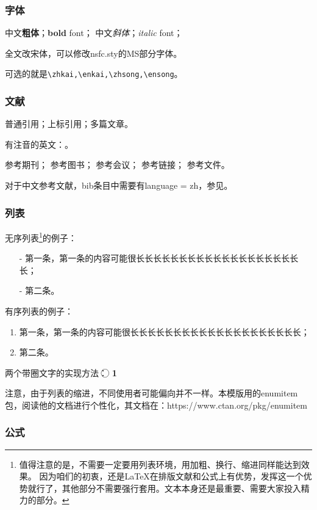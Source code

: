 \subsubsection{字体}
中文\textbf{粗体}；\textbf{bold} font；
中文\textit{斜体}；\textit{italic} font；

全文改宋体，可以修改nsfc.sty的MS部分字体。

可选的就是\verb|\zhkai,\enkai,\zhsong,\ensong|。

\subsubsection{文献}
普通引用\cite{test}；上标引用；多篇文章。

有注音的英文：\cite{test}。

参考期刊\cite{test}；
参考图书\cite{test2}；
参考会议\cite{test5}；
参考链接\cite{test4}；
参考文件\cite{test6}。

对于中文参考文献，bib条目中需要有language = {zh}，参见\cite{test2}。
\subsubsection{列表}
无序列表\footnote{值得注意的是，不需要一定要用列表环境，用加粗、换行、缩进同样能达到效果。
	因为咱们的初衷，还是LaTeX在排版文献和公式上有优势，发挥这一个优势就行了，其他部分不需要强行套用。文本本身还是最重要、需要大家投入精力的部分。}的例子：
\begin{itemize}[left= 50pt]
	\item[-] 第一条，第一条的内容可能很长长长长长长长长长长长长长长长长长长长长；
	\item[-] 第二条。
\end{itemize}

有序列表的例子：
\begin{enumerate}[left= 50pt]
	\item 第一条，第一条的内容可能很长长长长长长长长长长长长长长长长长长长长；
	\item 第二条。
\end{enumerate}

两个带圈文字的实现方法：
\textcircled{}
\textcircled{\textbf{\small 1}}

注意，由于列表的缩进，不同使用者可能偏向并不一样。本模版用的enumitem包，阅读他的文档进行个性化，其文档在：https://www.ctan.org/pkg/enumitem


\subsubsection{公式}

